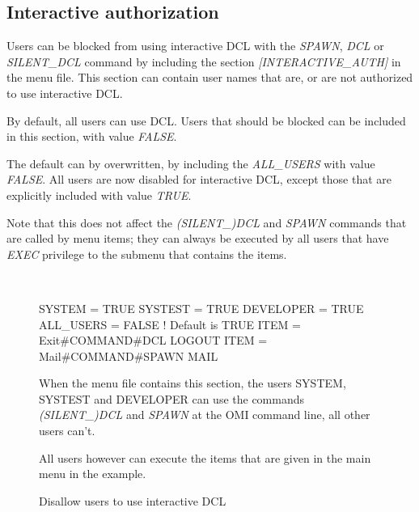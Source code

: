 \documentclass[a4paper]{book}
\newcommand{\vs}{\vspace{3mm}}
\renewcommand{\indent}{\hspace*{5mm}}
\begin{document}
\subsection{Interactive authorization}
\index{{\$}}
\label{subsubsec:interactive}

Users can be blocked from using interactive DCL with the \textsl{SPAWN}, \textsl{DCL} or  
\textsl{SILENT{\_}DCL} command by including the section \textsl{[INTERACTIVE{\_}AUTH]} in 
the menu file. This section can contain user names that are, or are not 
authorized to use interactive DCL.

\vs

By default, all users can use DCL. Users that should be blocked can be 
included in this section, with value \textsl{FALSE}.

The default can by overwritten, by including the \textsl{ALL{\_}USERS} with value 
\textsl{FALSE}. All users are now disabled for interactive DCL, except those that are 
explicitly included with value \textsl{TRUE}.

\vs

Note that this does not affect the \textsl{(SILENT{\_})DCL} and \textsl{SPAWN} commands that 
are called by menu items; they can always be executed by all users that have 
\textsl{EXEC} privilege to the submenu that contains the items.

\begin{figure}[h!tb]
\begin{minipage}[h!tb]{\textwidth}
\hrulefill \\
\begin{ttfamily}
 \newline
\indent SYSTEM = TRUE \newline
\indent SYSTEST = TRUE \newline
\indent DEVELOPER = TRUE \newline
\indent ALL{\_}USERS = FALSE ! Default is TRUE \newline
 \newline
{} \newline
\indent ITEM = Exit{\#}COMMAND{\#}DCL LOGOUT \newline
\indent ITEM = Mail{\#}COMMAND{\#}SPAWN MAIL \newline
\end{ttfamily}

\noindent When the menu file contains this section, the users SYSTEM, SYSTEST and 
DEVELOPER can use the commands \textsl{(SILENT{\_})DCL} and \textsl{SPAWN} at the OMI command 
line, all other users can't.

All users however can execute the items that are given in the main menu in 
the example. 
\caption{Disallow users to use interactive DCL}\label{fig:disallowdcl}
\hrulefill
\end{minipage}
\end{figure}
\end{document}
